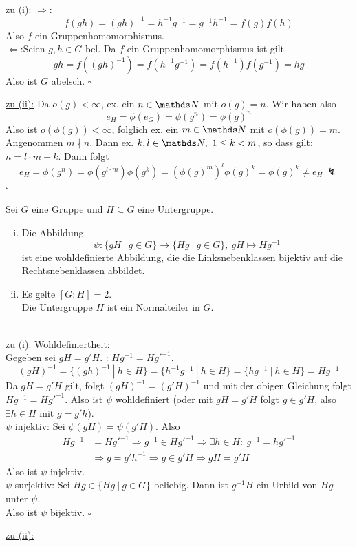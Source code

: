 \\
\uline{zu (i):} $\Rightarrow$: \[f(gh)=(gh)^{-1}=h^{-1}g^{-1}=g^{-1}h^{-1}=f(g)f(h) \]
Also $f$ ein Gruppenhomomorphismus.\\
$\Leftarrow$:Seien $g,h\in G$ bel. Da $f$ ein Gruppenhomomorphismus ist gilt \[gh=f((gh)^{-1})=f(h^{-1}g^{-1})=f(h^{-1})f(g^{-1})=hg \]
Also ist $G$ abelsch.
\hfill $\square$

\uline{zu (ii):} Da $o(g)<\infty$, ex. ein $n\in\N$ mit $o(g)=n$. Wir haben also \[e_H=\phi(e_G)=\phi(g^n)=\phi(g)^n \]
Also ist $o(\phi(g))<\infty$, folglich ex. ein $m\in \N$ mit $o(\phi(g))=m$. Angenommen $m\nmid n$. Dann ex. $k,l\in \N,~1\le k<m$, so dass gilt: $n=l\cdot m+k$. Dann folgt \[e_H=\phi(g^n)=\phi(g^{l\cdot m})\phi(g^k)=(\phi(g)^m)^l\phi(g)^k=\phi(g)^k\not=e_H~\lightning \]
\hfill $\square$

Sei $G$ eine Gruppe und $H\subseteq G$ eine Untergruppe.
\begin{enumerate}[(i)]
	\item Die Abbildung \[\psi:\{gH~|~g\in G \}\to \{Hg~|~g\in G \},~gH\mapsto Hg^{-1} \]
	ist eine wohldefinierte Abbildung, die die Linksnebenklassen bijektiv auf die Rechtsnebenklassen abbildet.
	\item Es gelte $[G:H]=2$.\\
	Die Untergruppe $H$ ist ein Normalteiler in $G$.
\end{enumerate}

\\
\uline{zu (i):} Wohldefiniertheit:\\
Gegeben sei $gH=g'H$. \zz: $Hg^{-1}=Hg'^{-1}$.\\
\[ (gH)^{-1}=\{(gh)^{-1}~|~h\in H \}= \{h^{-1}g^{-1}~|~h\in H \}= \{hg^{-1}~|~h\in H \}=Hg^{-1} \]
Da $gH=g'H$ gilt, folgt $(gH)^{-1}=(g'H)^{-1}$ und mit der obigen Gleichung folgt $Hg^{-1}=Hg'^{-1}$. Also ist $\psi$ wohldefiniert (oder mit $gH=g'H$ folgt $g\in g'H$, also $\exists h\in H$ mit $g=g'h$).\\
$\psi$ injektiv: Sei $\psi(gH)=\psi(g'H)$. Also
\begin{equation*}
\begin{aligned}
	Hg^{-1}&=Hg'^{-1} \Rightarrow g^{-1}\in Hg'^{-1} \Rightarrow \exists h\in H:~g^{-1}=hg'^{-1}\\ &\Rightarrow g=g'h^{-1} \Rightarrow g\in g'H \Rightarrow gH=g'H
\end{aligned}
\end{equation*}
Also ist $\psi$ injektiv.\\
$\psi$ surjektiv: Sei $Hg\in \{Hg~|~g\in G\}$ beliebig. Dann ist $g^{-1}H$ ein Urbild von $Hg$ unter $\psi$.\\
Also ist $\psi$ bijektiv.
\hfill $\square$
\newpage

\uline{zu (ii):}












\cleardoubleoddemptypage
{}
\setcounter{page}{1}




\printindex
\listoffigures
